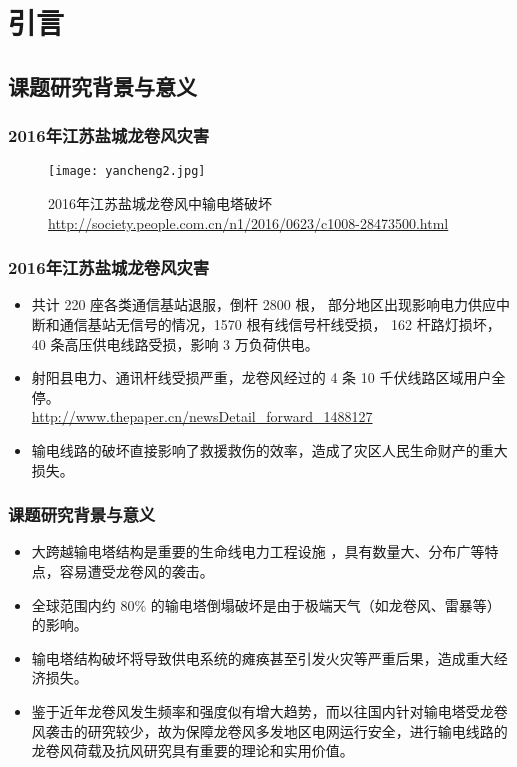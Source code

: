 
\section{引言}
\subsection{课题研究背景与意义}

\begin{frame}
  \frametitle{2016年江苏盐城龙卷风灾害}
  \begin{figure}
    \centering
    \texttt{[image: yancheng2.jpg]}
    \caption*{2016年江苏盐城龙卷风中输电塔破坏\\ \url{http://society.people.com.cn/n1/2016/0623/c1008-28473500.html}}
    
  \end{figure}
\end{frame}

\begin{frame}
  \frametitle{2016年江苏盐城龙卷风灾害}
  \begin{itemize}
  \item
    共计 220 座各类通信基站退服，倒杆 2800 根，
    部分地区出现影响电力供应中断和通信基站无信号的情况，1570 根有线信号杆线受损，
    162 杆路灯损坏，40 条高压供电线路受损，影响 3 万负荷供电。
  \item
    射阳县电力、通讯杆线受损严重，龙卷风经过的 4 条 10 千伏线路区域用户全停。\\
    {\scriptsize \url{http://www.thepaper.cn/newsDetail_forward_1488127}}
  \bigskip
  \item
    输电线路的破坏直接影响了救援救伤的效率，造成了灾区人民生命财产的重大损失。
  \end{itemize}
  
\end{frame}

\begin{frame}
  \frametitle{课题研究背景与意义}
  \begin{itemize}
  \item
    大跨越输电塔结构是重要的生命线电力工程设施 ，具有数量大、分布广等特点，容易遭受龙卷风的袭击。
  \item
    全球范围内约 $80\%$ 的输电塔倒塌破坏是由于极端天气（如龙卷风、雷暴等）的影响。
  \item
    输电塔结构破坏将导致供电系统的瘫痪甚至引发火灾等严重后果，造成重大经济损失。
  \bigskip
  \item
  鉴于近年龙卷风发生频率和强度似有增大趋势，而以往国内针对输电塔受龙卷风袭击的研究较少，故为保障龙卷风多发地区电网运行安全，进行输电线路的龙卷风荷载及抗风研究具有重要的理论和实用价值。

  \end{itemize}
 
\end{frame}

